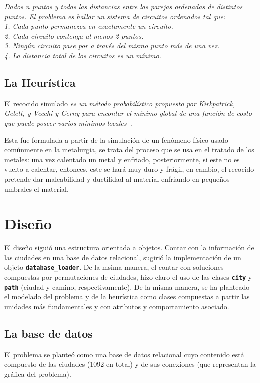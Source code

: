 \documentclass[a4paper]{report}
\begin{document}
\begin{center}
  \textit{Dados n puntos y todas las distancias entre las parejas ordenadas de
    distintos puntos. El problema es hallar un sistema de circuitos ordenados tal que:\\
    1. Cada punto permanezca en exactamente un circuito.\\
    2. Cada circuito contenga al menos 2 puntos.\\
    3. Ning\'un circuito pase por a trav\'es del mismo punto m\'as de una vez.\\
    4. La distancia total de los circuitos es un m\'inimo.
  }~\cite{julia}
\end{center}


\section{La Heur\'istica}
El recocido simulado \textit{es un m\'etodo probabil\'istico propuesto por Kirkpatrick, Gelett,
  y Vecchi y Cerny para encontar el m\'inimo global de una funci\'on de costo que puede poseer
  varios m\'inimos locales~\cite{dimitris}.}

Esta fue formulada a partir de la simulaci\'on de un fen\'omeno f\'isico usado com\'unmente
en la metalurgia, se trata del proceso que se usa en el tratado de los metales:
una vez calentado un metal y enfriado, posteriormente,
si este no es vuelto a calentar, entonces, este se har\'a muy duro y fr\'agil, en cambio, el recocido
pretende dar maleabilidad y ductilidad al material enfriando en peque\~nos umbrales el material.

\chapter{Dise\~no}

El dise\~no sigui\'o una estructura orientada a objetos. Contar con la informaci\'on
de las ciudades en una base de datos relacional, sugiri\'o la implementaci\'on de
un objeto \textbf{\texttt{database\_loader}}. De la msima manera, el contar con soluciones
compuestas por permutaciones de ciudades, hizo claro el uso de las clases
\textbf{\texttt{city}} y \textbf{\texttt{path}} (ciudad y camino, respectivamente).
De la misma manera, se ha planteado el modelado del problema y de la heur\'istica
como clases compuestas a partir las unidades m\'as fundamentales y con atributos y
comportamiento asociado.\\

\section{La base de datos}
El problema se plante\'o como una base de datos relacional cuyo contenido est\'a
compuesto de las ciudades (1092 en total) y de sus conexiones (que representan
la gr\'afica del problema).\\
\end{document}
